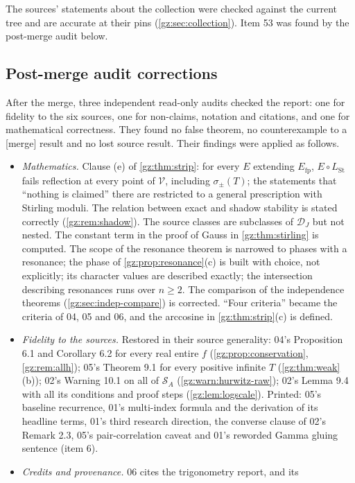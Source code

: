 \documentclass[11pt,a4paper]{article}
\numberwithin{equation}{section}
\theoremstyle{definition}
\theoremstyle{remark}
\newcommand{\Efp}{E_{\mathrm{fp}}}
\newcommand{\LSt}{L_{\mathrm{St}}}
\newcommand{\Vs}{\mathcal V}
\newcommand{\DJs}{\mathcal D_{J}}
\newcommand{\SA}{\mathcal S_{A}}
\newcommand{\merge}{\textup{[merge]}}
\begin{document}
The sources' statements about the collection were checked against the
current tree and are accurate at their pins (\cref{gz:sec:collection}).
Item 53 was found by the post-merge audit below.

\subsection{Post-merge audit corrections}\label{gz:app:audit}
After the merge, three independent read-only audits checked the report: one
for fidelity to the six sources, one for non-claims, notation and
citations, and one for mathematical correctness. They found no false
theorem, no counterexample to a \merge{} result and no lost source result.
Their findings were applied as follows.
\begin{itemize}
\item \emph{Mathematics.} Clause (e) of \cref{gz:thm:strip}: for every $E$
 extending $\Efp$, $E\circ\LSt$ fails reflection at every point of $\Vs$,
 including $\sigma_\pm(T)$; the statements that ``nothing is claimed'' there
 are restricted to a general prescription with Stirling moduli. The
 relation between exact and shadow stability is stated correctly
 (\cref{gz:rem:shadow}). The source classes are subclasses of $\DJs$ but
 not nested. The constant term in the proof of Gauss in
 \cref{gz:thm:stirling} is computed. The scope of the resonance theorem is
 narrowed to phases with a resonance; the phase of
 \cref{gz:prop:resonance}(c) is built with choice, not explicitly; its
 character values are described exactly; the intersection describing
 resonances runs over $n\ge2$. The comparison of the independence theorems
 (\cref{gz:sec:indep-compare}) is corrected. ``Four criteria'' became the
 criteria of 04, 05 and 06, and the arccosine in \cref{gz:thm:strip}(c) is
 defined.
\item \emph{Fidelity to the sources.} Restored in their source generality: 04's
 Proposition 6.1 and Corollary 6.2 for every real entire $f$
 (\cref{gz:prop:conservation}, \cref{gz:rem:allh}); 05's Theorem 9.1 for
 every positive infinite $T$ (\cref{gz:thm:weak}(b)); 02's Warning 10.1 on
 all of $\SA$ (\cref{gz:warn:hurwitz-raw}); 02's Lemma 9.4 with all its
 conditions and proof steps (\cref{gz:lem:logscale}). Printed: 05's
 baseline recurrence, 01's multi-index formula and the derivation of its
 headline terms, 01's third research direction, the converse clause of 02's
 Remark 2.3, 05's pair-correlation caveat and 01's reworded Gamma gluing
 sentence (item 6).
\item \emph{Credits and provenance.} 06 cites the trigonometry report, and its

\end{itemize}
\end{document}
